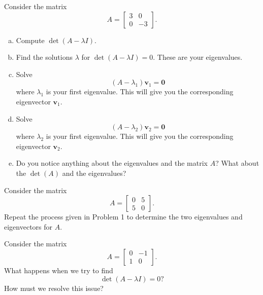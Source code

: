 \begin{problem} Consider the matrix 
\[
A= \begin{bmatrix}
3 & 0\\
0 & -3
\end{bmatrix}.
\]
\begin{enumerate}[(a)]
    \item Compute $\det(A-\lambda I)$.
    \item Find the solutions $\lambda$ for $\det(A-\lambda I)=0$.  These are your eigenvalues.
    \item Solve 
    \[
    (A-\lambda_1)\mathbf{v}_1=\mathbf{0}
    \]
    where $\lambda_1$ is your first eigenvalue. This will give you the corresponding eigenvector $\mathbf{v}_1$.
    \item Solve 
    \[
    (A-\lambda_2)\mathbf{v}_2=\mathbf{0}
    \]
    where $\lambda_2$ is your first eigenvalue. This will give you the corresponding eigenvector $\mathbf{v}_2$.
    \item Do you notice anything about the eigenvalues and the matrix $A$? What about the $\det(A)$ and the eigenvalues?
\end{enumerate}
\end{problem}

\begin{problem}
Consider the matrix
\[
A=\begin{bmatrix}
0 & 5\\
5 & 0
\end{bmatrix}.
\]
Repeat the process given in Problem 1 to determine the two eigenvalues and eigenvectors for $A$.
\end{problem}

\begin{problem}
Consider the matrix 
\[
A=
\begin{bmatrix}
0 & -1\\
1 & 0
\end{bmatrix}.
\]
What happens when we try to find
\[
\det(A-\lambda I)=0? 
\]
How must we resolve this issue?
\end{problem}

        
